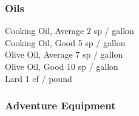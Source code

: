 \begin{multicols}{3}
{\subsubsection{Oils}

Cooking Oil, Average		\hfill 2 sp / gallon \\
Cooking Oil, Good		\hfill 5 sp / gallon \\
Olive Oil, Average		\hfill 7 sp / gallon \\
Olive Oil, Good			\hfill 10 sp / gallon \\
Lard				\hfill 1 cf / pound \\

\subsubsection{Adventure Equipment}

}
\end{multicols}
